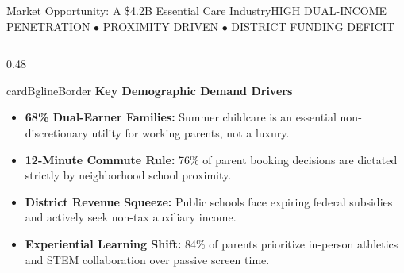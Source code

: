 \documentclass[aspectratio=169,9pt]{beamer}
\begin{document}
\begin{frame}{Market Opportunity: A \$4.2B Essential Care Industry}{HIGH DUAL-INCOME PENETRATION $\bullet$ PROXIMITY DRIVEN $\bullet$ DISTRICT FUNDING DEFICIT}
\begin{columns}[T]
  \begin{column}{0.48\textwidth}
    \begin{execbox}{cardBg}{lineBorder}
      \textcolor{brandNavy}{\textbf{\scriptsize Key Demographic Demand Drivers}} \\[2pt]
      \tiny
      \begin{itemize}
        \item \textbf{68\% Dual-Earner Families:} Summer childcare is an essential non-discretionary utility for working parents, not a luxury.
        \vskip2pt
        \item \textbf{12-Minute Commute Rule:} 76\% of parent booking decisions are dictated strictly by neighborhood school proximity.
        \vskip2pt
        \item \textbf{District Revenue Squeeze:} Public schools face expiring federal subsidies and actively seek non-tax auxiliary income.
        \vskip2pt
        \item \textbf{Experiential Learning Shift:} 84\% of parents prioritize in-person athletics and STEM collaboration over passive screen time.
      \end{itemize}
    \end{execbox}
  \end{column}
\end{columns}

\end{frame}
\end{document}
